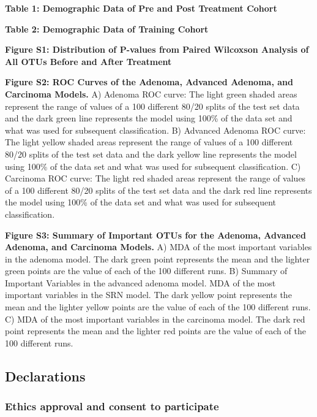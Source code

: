 \documentclass[12pt,]{article}
\begin{document}
\newpage

\textbf{Table 1: Demographic Data of Pre and Post Treatment Cohort}

\textbf{Table 2: Demographic Data of Training Cohort}

\newpage

\textbf{Figure S1: Distribution of P-values from Paired Wilcoxson
Analysis of All OTUs Before and After Treatment}

\textbf{Figure S2: ROC Curves of the Adenoma, Advanced Adenoma, and
Carcinoma Models.} A) Adenoma ROC curve: The light green shaded areas
represent the range of values of a 100 different 80/20 splits of the
test set data and the dark green line represents the model using 100\%
of the data set and what was used for subsequent classification. B)
Advanced Adenoma ROC curve: The light yellow shaded areas represent the
range of values of a 100 different 80/20 splits of the test set data and
the dark yellow line represents the model using 100\% of the data set
and what was used for subsequent classification. C) Carcinoma ROC curve:
The light red shaded areas represent the range of values of a 100
different 80/20 splits of the test set data and the dark red line
represents the model using 100\% of the data set and what was used for
subsequent classification.

\textbf{Figure S3: Summary of Important OTUs for the Adenoma, Advanced
Adenoma, and Carcinoma Models.} A) MDA of the most important variables
in the adenoma model. The dark green point represents the mean and the
lighter green points are the value of each of the 100 different runs. B)
Summary of Important Variables in the advanced adenoma model. MDA of the
most important variables in the SRN model. The dark yellow point
represents the mean and the lighter yellow points are the value of each
of the 100 different runs. C) MDA of the most important variables in the
carcinoma model. The dark red point represents the mean and the lighter
red points are the value of each of the 100 different runs.

\newpage

\subsection{Declarations}\label{declarations}

\subsubsection{Ethics approval and consent to
participate}\label{ethics-approval-and-consent-to-participate}
\end{document}
